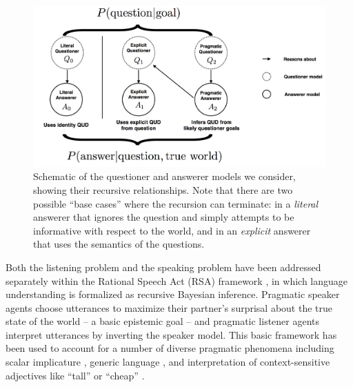 \documentclass[12pt, floatsintext, jou]{apa6}
\begin{document}
\begin{figure}[t]
\begin{center}
\includegraphics[scale = .5]{models.png}
\end{center}
\caption{Schematic of the questioner and answerer models we consider, showing their recursive relationships. Note that there are two possible ``base cases'' where the recursion can terminate: in a \emph{literal} answerer that ignores the question and simply attempts to be informative with respect to the world, and in an \emph{explicit} answerer that uses the semantics of the questions.}
\label{fig:models}
\end{figure}

Both the listening problem and the speaking problem have been addressed separately within the Rational Speech Act (RSA) framework \cite{FrankGoodman12_PragmaticReasoningLanguageGames, GoodmanStuhlmuller13_KnowledgeImplicature, GoodmanFrank16_RSATiCS}, in which language understanding is formalized as recursive Bayesian inference. Pragmatic speaker agents choose utterances to maximize their partner's surprisal about the true state of the world -- a basic epistemic goal -- and pragmatic listener agents interpret utterances by inverting the speaker model. This basic framework has been used to account for a number of diverse pragmatic phenomena including 
scalar implicature \cite{GoodmanStuhlmuller13_KnowledgeImplicature}, %
generic language \cite{TesslerGoodman16_Generics}, and
interpretation of context-sensitive adjectives like ``tall'' or ``cheap'' \cite{LassiterGoodman15_AdjectivalVagueness}.
\end{document}
